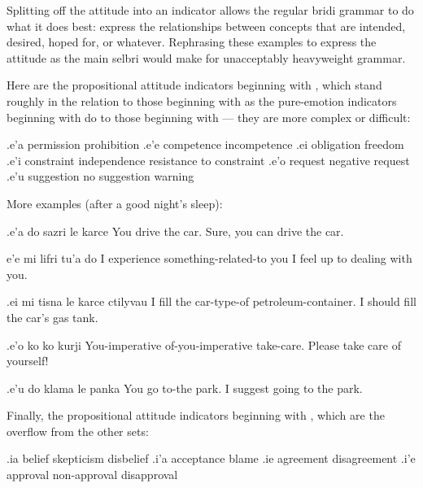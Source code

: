 Splitting off the attitude into an indicator allows the
    regular bridi grammar to do what it does best: express the
    relationships between concepts that are intended, desired,
    hoped for, or whatever. Rephrasing these examples to express
    the attitude as the main selbri would make for unacceptably
    heavyweight grammar.

Here are the propositional attitude indicators beginning
    with , which stand roughly in the relation to those
    beginning with  as the pure-emotion indicators beginning
    with  do to those beginning with  --- they are more
    complex or difficult:

   .e'a    permission          prohibition
    .e'e    competence          incompetence
    .ei obligation          freedom
    .e'i    constraint  independence    resistance to constraint
    .e'o    request             negative request
    .e'u    suggestion  no suggestion   warning

More examples (after a good night's sleep):
\begin{example}
.e'a do sazri le karce\n
{} You drive the car.\n
Sure, you can drive the car.
\end{example}

\begin{example}
e'e mi lifri tu'a do\n
{} I experience something-related-to you\n
I feel up to dealing with you.
\end{example}

\begin{example}
.ei mi tisna\n
\T	le karce ctilyvau\n
{} I fill\n
\T	the car-type-of petroleum-container.\n
I should fill the car's gas tank.
\end{example}

\begin{example}
.e'o ko ko kurji\n
{} You-imperative of-you-imperative take-care.\n
Please take care of yourself!
\end{example}

\begin{example}
.e'u do klama le panka\n
{} You go to-the park.\n
I suggest going to the park.
\end{example}

Finally, the propositional attitude indicators beginning
    with , which are the overflow from the other sets:

   .ia belief      skepticism  disbelief
    .i'a    acceptance          blame
    .ie agreement           disagreement
    .i'e    approval    non-approval    disapproval


